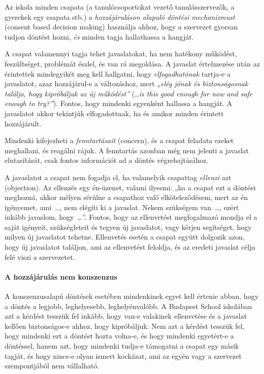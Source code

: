 Az iskola minden csapata (a tanulócsoportokat vezető tanulásszervezők,
a gyerekek egy csapata stb.) a \emph{hozzájáruláson alapuló döntési
mechanizmust} (consent based decision making) használja ahhoz, hogy a
szervezet gyorsan tudjon döntést hozni, \emph{és} minden tagja
hallathassa a hangját.

A csapat valamennyi tagja tehet javaslatokat, ha nem hatékony működést,
feszültséget, problémát észlel, és van rá megoldása. A javaslat
értelmezése után az érintettek mindegyikét meg kell hallgatni, hogy
\emph{elfogadhatónak} tartja-e a javaslatot, azaz hozzájárul-e a
változáshoz, mert \emph{„elég jónak és biztonságosnak találja, hogy
kipróbáljuk az új működést”} (\emph{,,is this good enough for now and
safe enough to try?''}). Fontos, hogy mindenki egyenként hallassa
a hangját. A javaslatot akkor tekintjük elfogadottnak, ha és amikor minden érintett
hozzájárult.

Mindenki kifejezheti a \emph{fenntartásait} (concern), és a csapat
feladata ezeket meghallani, és reagálni rájuk. A fenntartás azonban még
nem jelenti a javaslat elutasítását, csak fontos információt ad a döntés
végrehajtásához.

A javaslatot a csapat nem fogadja el, ha valamelyik csapattag
\emph{ellenzi} azt (objection). Az ellenzés egy én-üzenet, valami
ilyesmi: „ha a csapat ezt a döntést meghozná, akkor mélyen sérülne a
csapathoz való elköteleződésem, mert az én igényemet, ami~\ldots{}, nem
elégíti ki a javaslat. Nekem szükségem van~\ldots{}, ezért inkább
javaslom, hogy~\ldots{}''. Fontos, hogy az ellenvetést megfogalmazó
mondja el a saját igényeit, szükségleteit és tegyen új javaslatot, vagy
kérjen segítséget, hogy milyen új javaslatot tehetne. Ellenvetés esetén
a csapat együtt dolgozik azon, hogy új javaslatot találjon, ami az
ellenvetést feloldja, és az eredeti javaslat célja felé viszi a
szervezetet.

\hypertarget{a-hozzajarulas-nem-konszenzus}{%
\paragraph{A hozzájárulás nem
konszenzus}\label{a-hozzajarulas-nem-konszenzus}}

A konszenzusalapú döntések esetében mindenkinek egyet kell értenie abban,
hogy a döntés a legjobb, leghelyesebb, leghelyénvalóbb. A Budapest
School iskolában azt a kérdést tesszük fel inkább, hogy van-e valakinek
ellenvetése és a javaslat kellően biz\-ton\-sá\-gos-e ahhoz, hogy kipróbáljuk.
Nem azt a kérdést tesszük fel, hogy mindenki ezt a döntést hozta volna-e,
és hogy mindenki egyetért-e a döntéssel, hanem azt, hogy mindenki tudja-e
támogatni a csapat egy másik tagját, és hogy nincs-e olyan ismert kockázat,
ami az egyén vagy a szervezet szempontjából nem vállalható.

